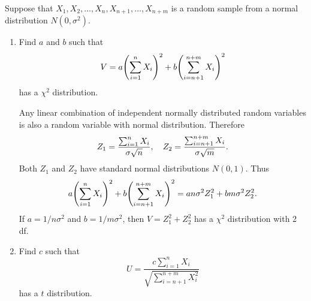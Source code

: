 \documentclass[10pt]{article}
\begin{document}
	\begin{exercise}
		Suppose that $X_1, X_2, \dots, X_n, X_{n+1}, \dots, X_{n+m}$ is a random sample from a normal distribution $N(0, \sigma^2)$.
		\begin{enumerate}
			\item Find $a$ and $b$ such that
			\begin{equation}
				V = a\qty(\sum_{i=1}^n X_i)^2 + b\qty(\sum_{i=n+1}^{n+m} X_i)^2
			\end{equation}
			has a $\chi^2$ distribution.
			\begin{solution}
				Any linear combination of independent normally distributed random variables is also a random variable with normal distribution. Therefore
				\begin{equation}
					Z_1 = \frac{\sum_{i=1}^n X_i}{\sigma \sqrt{n}} \qc Z_2 = \frac{\sum_{i=n+1}^{n+m} X_i}{\sigma \sqrt{m}}.
				\end{equation}
				Both $Z_1$ and $Z_2$ have standard normal distributions $N(0,1)$. Thus
				\begin{equation}
					a\qty(\sum_{i=1}^n X_i)^2 + b\qty(\sum_{i=n+1}^{n+m} X_i)^2 = a n \sigma^2 Z_1^2 + b m \sigma^2 Z_2^2.
				\end{equation}
				If $a = 1/n\sigma^2$ and $b = 1/m\sigma^2$, then $V = Z_1^2 + Z_2^2$ has a $\chi^2$ distribution with 2 df.
			\end{solution}

			\item Find $c$ such that
			\begin{equation}
				U = \frac{c \sum_{i=1}^n X_i}{\sqrt{\sum_{i=n+1}^{n+m} X_i^2}}
			\end{equation}
			has a $t$ distribution.


\end{enumerate}
\end{exercise}
\end{document}

